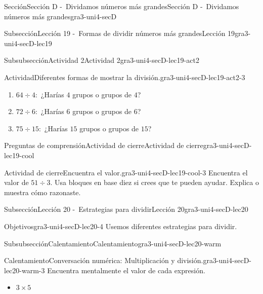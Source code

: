 \documentclass[twoside,10pt,]{article}
\begin{document}
\begin{sectionptx}{Sección}{Sección D -~Dividamos números más grandes}{}{Sección D -~Dividamos números más grandes}{}{}{gra3-uni4-secD}
\begin{subsectionptx}{Subsección}{Lección 19 -~Formas de dividir números más grandes}{}{Lección 19}{}{}{gra3-uni4-secD-lec19}
\begin{subsubsectionptx}{Subsubsección}{Actividad 2}{}{Actividad 2}{}{}{gra3-uni4-secD-lec19-act2}
\begin{activity}{Actividad}{Diferentes formas de mostrar la división.}{gra3-uni4-secD-lec19-act2-3}
\begin{enumerate}
%
\begin{enumerate}
\item{}\(64 \div 4:\) ¿Harías \(4\) grupos o grupos de \(4\)?%
\item{}\(72 \div 6:\) ¿Harías \(6\) grupos o grupos de \(6\)?%
\item{}\(75 \div 15:\) ¿Harías \(15\) grupos o grupos de \(15\)?%
\end{enumerate}
\end{enumerate}
\end{activity}%
\end{subsubsectionptx}
%
%
\typeout{************************************************}
\typeout{************************************************}
%
\begin{reading-questions-subsubsection}{Preguntas de comprensión}{Actividad de cierre}{}{Actividad de cierre}{}{}{gra3-uni4-secD-lec19-cool}
\begin{project}{Actividad de cierre}{Encuentra el valor.}{gra3-uni4-secD-lec19-cool-3}%
Encuentra el valor de \(51 \div 3.\) Usa bloques en base diez si crees que te pueden ayudar. Explica o muestra cómo razonaste.%
\end{project}%
\end{reading-questions-subsubsection}
\end{subsectionptx}
%
%
\typeout{************************************************}
\typeout{************************************************}
%
\begin{subsectionptx}{Subsección}{Lección 20 -~Estrategias para dividir}{}{Lección 20}{}{}{gra3-uni4-secD-lec20}
\begin{objectives}{Objetivos}{gra3-uni4-secD-lec20-4}
Usemos diferentes estrategias para dividir.%
\end{objectives}
%
%
\typeout{************************************************}
\typeout{************************************************}
%
\begin{subsubsectionptx}{Subsubsección}{Calentamiento}{}{Calentamiento}{}{}{gra3-uni4-secD-lec20-warm}
\begin{exploration}{Calentamiento}{Conversación numérica: Multiplicación y división.}{gra3-uni4-secD-lec20-warm-3}%
Encuentra mentalmente el valor de cada expresión.%
%
\begin{itemize}[label=\textbullet]
\item{}\(\displaystyle 3\times 5\)%

\end{itemize}
\end{exploration}
\end{subsubsectionptx}
\end{subsectionptx}
\end{sectionptx}
\end{document}
